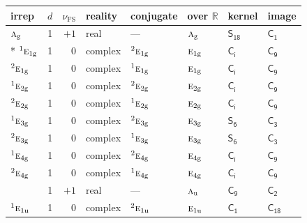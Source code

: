 \documentclass[10pt,a4paper]{article}
\numberwithin{equation}{section}
\newcommand{\grp}[1]{\mathsf{#1}}
\newcommand{\irr}[1]{\text{\normalfont\scshape #1}}
\newcommand{\conjpair}[1]{{}^{#1}}
\newcommand{\detbox}[1]{{\setlength{\fboxsep}{1pt}\fbox{#1}}}
\newcommand{\ptag}[1]{\mathrm{#1}}
\newcommand{\fsind}{\nu_{\mathrm{FS}}}
\begin{document}
{\small\renewcommand{\arraystretch}{1.25}\setlength{\tabcolsep}{4pt}\begin{longtable}{@{}lrrlllll@{}}\toprule
irrep & $d$ & $\fsind$ & reality & conjugate & over $\mathbb{R}$ & kernel & image\\\midrule\endhead
\bottomrule\endfoot\endlastfoot
$\irr{a}_{\ptag{g}}$ & 1 & $+1$ & real & --- & $\irr{a}_{\ptag{g}}$ & \href{S18.pdf}{$\grp{S_{18}}$} & \href{C1.pdf}{$\grp{C_{1}}$}\\*
$\conjpair{1}\irr{e}_{1\ptag{g}}$ & 1 & $0$ & complex & $\conjpair{2}\irr{e}_{1\ptag{g}}$ & $\irr{e}_{1\ptag{g}}$ & \href{S2.pdf}{$\grp{C_{i}}$} & \href{C9.pdf}{$\grp{C_{9}}$}\\
$\conjpair{2}\irr{e}_{1\ptag{g}}$ & 1 & $0$ & complex & $\conjpair{1}\irr{e}_{1\ptag{g}}$ & $\irr{e}_{1\ptag{g}}$ & \href{S2.pdf}{$\grp{C_{i}}$} & \href{C9.pdf}{$\grp{C_{9}}$}\\
$\conjpair{1}\irr{e}_{2\ptag{g}}$ & 1 & $0$ & complex & $\conjpair{2}\irr{e}_{2\ptag{g}}$ & $\irr{e}_{2\ptag{g}}$ & \href{S2.pdf}{$\grp{C_{i}}$} & \href{C9.pdf}{$\grp{C_{9}}$}\\
$\conjpair{2}\irr{e}_{2\ptag{g}}$ & 1 & $0$ & complex & $\conjpair{1}\irr{e}_{2\ptag{g}}$ & $\irr{e}_{2\ptag{g}}$ & \href{S2.pdf}{$\grp{C_{i}}$} & \href{C9.pdf}{$\grp{C_{9}}$}\\
$\conjpair{1}\irr{e}_{3\ptag{g}}$ & 1 & $0$ & complex & $\conjpair{2}\irr{e}_{3\ptag{g}}$ & $\irr{e}_{3\ptag{g}}$ & \href{S6.pdf}{$\grp{S_{6}}$} & \href{C3.pdf}{$\grp{C_{3}}$}\\
$\conjpair{2}\irr{e}_{3\ptag{g}}$ & 1 & $0$ & complex & $\conjpair{1}\irr{e}_{3\ptag{g}}$ & $\irr{e}_{3\ptag{g}}$ & \href{S6.pdf}{$\grp{S_{6}}$} & \href{C3.pdf}{$\grp{C_{3}}$}\\
$\conjpair{1}\irr{e}_{4\ptag{g}}$ & 1 & $0$ & complex & $\conjpair{2}\irr{e}_{4\ptag{g}}$ & $\irr{e}_{4\ptag{g}}$ & \href{S2.pdf}{$\grp{C_{i}}$} & \href{C9.pdf}{$\grp{C_{9}}$}\\
$\conjpair{2}\irr{e}_{4\ptag{g}}$ & 1 & $0$ & complex & $\conjpair{1}\irr{e}_{4\ptag{g}}$ & $\irr{e}_{4\ptag{g}}$ & \href{S2.pdf}{$\grp{C_{i}}$} & \href{C9.pdf}{$\grp{C_{9}}$}\\
\detbox{$\irr{a}_{\ptag{u}}$} & 1 & $+1$ & real & --- & $\irr{a}_{\ptag{u}}$ & \href{C9.pdf}{$\grp{C_{9}}$} & \href{C2.pdf}{$\grp{C_{2}}$}\\
$\conjpair{1}\irr{e}_{1\ptag{u}}$ & 1 & $0$ & complex & $\conjpair{2}\irr{e}_{1\ptag{u}}$ & $\irr{e}_{1\ptag{u}}$ & \href{C1.pdf}{$\grp{C_{1}}$} & $\grp{C_{18}}$\\

\end{longtable}}
\end{document}
